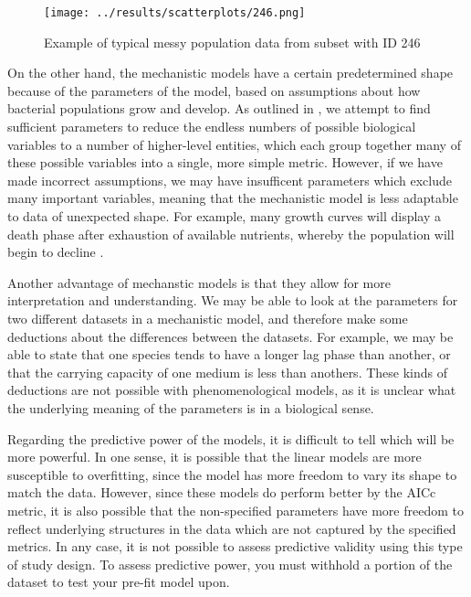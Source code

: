 \documentclass[11pt,a4wide,titlepage]{article}
\begin{document}
\begin{figure}
	\begin{center}
		\texttt{[image: ../results/scatterplots/246.png]}\\
		\caption{Example of typical messy population data from subset with ID 246}\label{Messy}
	\end{center}
	\end{figure}


On the other hand, the mechanistic models have a certain predetermined shape because of the parameters of the model, based on assumptions about how bacterial populations grow and develop. As outlined in \cite{levinsSTRATEGYMODELBUILDING1966}, we attempt to find sufficient parameters to reduce the endless numbers of possible biological variables to a number of higher-level entities, which each group together many of these possible variables into a single, more simple metric. However, if we have made incorrect assumptions, we may have insufficent parameters which exclude many important variables, meaning that the mechanistic model is less adaptable to data of unexpected shape. For example, many growth curves will display a death phase after exhaustion of available nutrients, whereby the population will begin to decline \citep{whitingQuantitativeModelBacterial1992}.

Another advantage of mechanstic models is that they allow for more interpretation and understanding. We may be able to look at the parameters for two different datasets in a mechanistic model, and therefore make some deductions about the differences between the datasets. For example, we may be able to state that one species tends to have a longer lag phase than another, or that the carrying capacity of one medium is less than anothers. These kinds of deductions are not possible with phenomenological models, as it is unclear what the underlying meaning of the parameters is in a biological sense. 

Regarding the predictive power of the models, it is difficult to tell which will be more powerful. In one sense, it is possible that the linear models are more susceptible to overfitting, since the model has more freedom to vary its shape to match the data. However, since these models do perform better by the AICc metric, it is also possible that the non-specified parameters have more freedom to reflect underlying structures in the data which are not captured by the specified metrics. In any case, it is not possible to assess predictive validity using this type of study design. To assess predictive power, you must withhold a portion of the dataset to test your pre-fit model upon.


\end{document}

